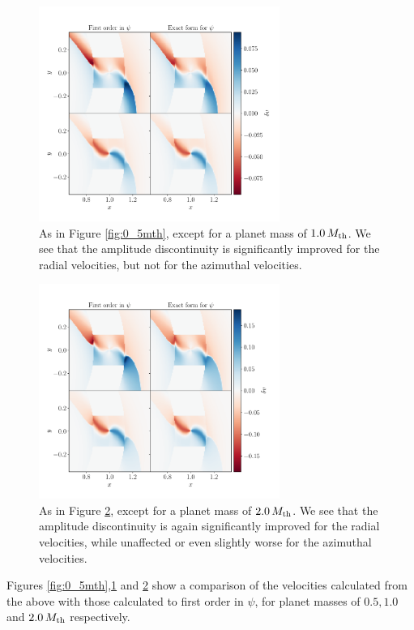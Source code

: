 \begin{figure}
    \centering
    \includegraphics[width = 0.7\textwidth]{figures/1_0_mth.pdf}
    \caption{As in Figure \ref{fig:0_5mth}, except for a planet mass of $1.0 \, M_{\rm th}$. We see that the amplitude discontinuity is significantly improved for the radial velocities, but not for the azimuthal velocities.}
    \label{fig:1_0mth}
\end{figure}
\begin{figure}
    \centering
    \includegraphics[width = 0.7\textwidth]{figures/2_0_mth.pdf}
    \caption{As in Figure \ref{fig:2_0mth}, except for a planet mass of $2.0 \, M_{\rm th}$. We see that the amplitude discontinuity is again significantly improved for the radial velocities, while unaffected or even slightly worse for the azimuthal velocities.}
    \label{fig:2_0mth}
\end{figure}
Figures \ref{fig:0_5mth},\ref{fig:1_0mth} and \ref{fig:2_0mth} show a comparison of the velocities calculated from the above with those calculated to first order in $\psi$, for planet masses of $0.5, 1.0$ and $2.0 \, M_{\rm th}$ respectively. 
